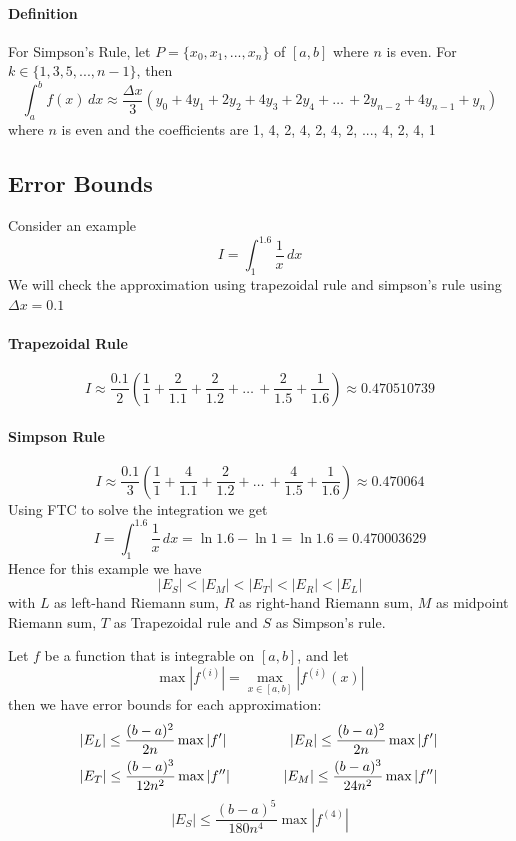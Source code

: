 \documentclass[12pt]{article}
\newcommand\tab[1][1cm]{\hspace*{#1}}
\begin{document}
\paragraph{Definition} For Simpson's Rule, let $P = \{x_0, x_1, ..., x_n \}$ of $[a, b]$ where $n$ is even. For $k \in \{1,3,5,..., n-1\}$, then 
\[
    \int_a^b f(x) \, dx \approx \frac{\Delta x}{3} (y_0 + 4y_1 + 2y_2 + 4y_3 + 2y_4 + \dots\, + 2y_{n - 2} + 4y_{n - 1} + y_n)
\]
where $n$ is even and the coefficients are 1, 4, 2, 4, 2, 4, 2, ..., 4, 2, 4, 1
\subsection{Error Bounds}
Consider an example
\[
    I = \int_1^{1.6} \frac{1}{x} \, dx
\]
We will check the approximation using trapezoidal rule and simpson's rule using $\Delta x = 0.1$ 

\paragraph{Trapezoidal Rule}
\[
    I \approx \frac{0.1}{2} (\frac{1}{1} + \frac{2}{1.1} + \frac{2}{1.2} + \dots\, + \frac{2}{1.5} + \frac{1}{1.6}) \approx 0.470510739
\]

\paragraph{Simpson Rule}
\[
    I \approx \frac{0.1}{3} (\frac{1}{1} + \frac{4}{1.1} + \frac{2}{1.2} + \dots\, + \frac{4}{1.5} + \frac{1}{1.6}) \approx 0.470064
\]
Using FTC to solve the integration we get 
\[
    I = \int_1^{1.6} \frac{1}{x} \, dx = \ln 1.6 - \ln 1 = \ln 1.6 = 0.470003629
\]
Hence for this example we have
\[
    |E_S| < |E_M| < |E_T| < |E_R| < |E_L|
\]
with $L$ as left-hand Riemann sum, $R$ as right-hand Riemann sum, $M$ as midpoint Riemann sum, $T$ as Trapezoidal rule and $S$ as Simpson's rule.

\noindent
Let $f$ be a function that is integrable on $[a, b]$, and let 
\[
    \max |f^{(i)}| = \max_{x \in [a, b]} |f^{(i)}(x)|
\]
then we have error bounds for each approximation:
\begin{align*} 
   &|E_L| \leq \frac{(b - a)^2}{2n} \max |f'| \textrm{\tab}  &|E_R| \leq \frac{(b - a)^2}{2n} \max |f'|\, \\
   &|E_T| \leq \frac{(b - a)^3}{12n^2} \max |f''| \textrm{\tab}  &|E_M| \leq \frac{(b - a)^3}{24n^2} \max |f''|\,
\end{align*}
\[
    |E_S| \leq \frac{(b - a)^5}{180n^4} \max |f^{(4)}| 
\]
\end{document}
